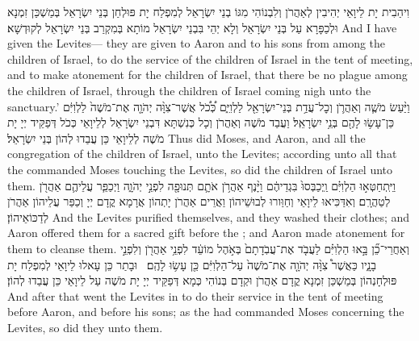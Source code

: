 {וִיהַבִית יָת לֵיוָאֵי יְהִיבִין לְאַהֲרֹן וְלִבְנוֹהִי מִגּוֹ בְנֵי יִשְׂרָאֵל לְמִפְלַח יָת פּוּלְחַן בְּנֵי יִשְׂרָאֵל בְּמַשְׁכַּן זִמְנָא וּלְכַפָּרָא עַל בְּנֵי יִשְׂרָאֵל וְלָא יְהֵי בִּבְנֵי יִשְׂרָאֵל מוֹתָא בְּמִקְרַב בְּנֵי יִשְׂרָאֵל לְקוּדְשָׁא׃}
{And I have given the Levites— they are given to Aaron and to his sons from among the children of Israel, to do the service of the children of Israel in the tent of meeting, and to make atonement for the children of Israel, that there be no plague among the children of Israel, through the children of Israel coming nigh unto the sanctuary.’}{}
{וַיַּ֨עַשׂ מֹשֶׁ֧ה וְאַהֲרֹ֛ן וְכׇל־עֲדַ֥ת בְּנֵי־יִשְׂרָאֵ֖ל לַלְוִיִּ֑ם כְּ֠כֹ֠ל אֲשֶׁר־צִוָּ֨ה יְהֹוָ֤ה אֶת־מֹשֶׁה֙ לַלְוִיִּ֔ם כֵּן־עָשׂ֥וּ לָהֶ֖ם בְּנֵ֥י יִשְׂרָאֵֽל׃
}
{וַעֲבַד מֹשֶׁה וְאַהֲרֹן וְכָל כְּנִשְׁתָּא דִּבְנֵי יִשְׂרָאֵל לְלֵיוָאֵי כְּכֹל דְּפַקֵּיד יְיָ יָת מֹשֶׁה לְלֵיוָאֵי כֵּן עֲבַדוּ לְהוֹן בְּנֵי יִשְׂרָאֵל׃}
{Thus did Moses, and Aaron, and all the congregation of the children of Israel, unto the Levites; according unto all that the \lord\space commanded Moses touching the Levites, so did the children of Israel unto them.}{}
{וַיִּֽתְחַטְּא֣וּ הַלְוִיִּ֗ם וַֽיְכַבְּסוּ֙ בִּגְדֵיהֶ֔ם וַיָּ֨נֶף אַהֲרֹ֥ן אֹתָ֛ם תְּנוּפָ֖ה לִפְנֵ֣י יְהֹוָ֑ה וַיְכַפֵּ֧ר עֲלֵיהֶ֛ם אַהֲרֹ֖ן לְטַהֲרָֽם׃}
{וְאִדַּכִּיאוּ לֵיוָאֵי וְחַוַּורוּ לְבוּשֵׁיהוֹן וַאֲרֵים אַהֲרֹן יָתְהוֹן אֲרָמָא קֳדָם יְיָ וְכַפַּר עֲלֵיהוֹן אַהֲרֹן לְדַכּוֹאֵיהוֹן׃}
{And the Levites purified themselves, and they washed their clothes; and Aaron offered them for a sacred gift before the \lord; and Aaron made atonement for them to cleanse them.}{}
{וְאַחֲרֵי־כֵ֞ן בָּ֣אוּ הַלְוִיִּ֗ם לַעֲבֹ֤ד אֶת־עֲבֹֽדָתָם֙ בְּאֹ֣הֶל מוֹעֵ֔ד לִפְנֵ֥י אַהֲרֹ֖ן וְלִפְנֵ֣י בָנָ֑יו כַּאֲשֶׁר֩ צִוָּ֨ה יְהֹוָ֤ה אֶת־מֹשֶׁה֙ עַל־הַלְוִיִּ֔ם כֵּ֖ן עָשׂ֥וּ לָהֶֽם׃ \setuma 
{}}
{וּבָתַר כֵּן עָאלוּ לֵיוָאֵי לְמִפְלַח יָת פּוּלְחָנְהוֹן בְּמַשְׁכַּן זִמְנָא קֳדָם אַהֲרֹן וּקְדָם בְּנוֹהִי כְּמָא דְּפַקֵּיד יְיָ יָת מֹשֶׁה עַל לֵיוָאֵי כֵּן עֲבַדוּ לְהוֹן׃}
{And after that went the Levites in to do their service in the tent of meeting before Aaron, and before his sons; as the \lord\space had commanded Moses concerning the Levites, so did they unto them.}{}
